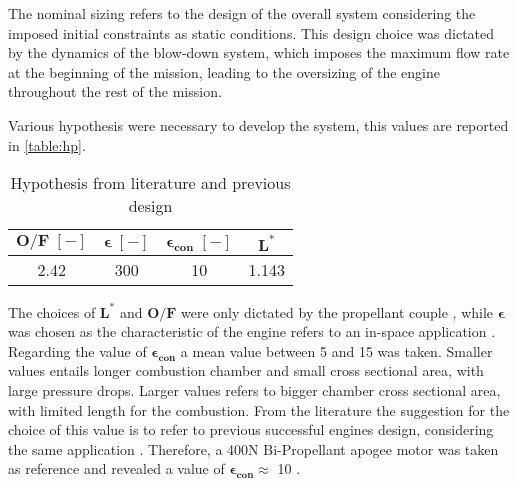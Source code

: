 The nominal sizing refers to the design of the overall system considering the imposed initial constraints as static conditions. This design choice was dictated by the dynamics of the blow-down system, which imposes the maximum flow rate at the beginning of the mission, leading to the oversizing of the engine throughout the rest of the mission. %

Various hypothesis were necessary to develop the system, this values are reported in \autoref{table:hp}.

\begin{table}[H]
    \renewcommand{\arraystretch}{1.2}
    \centering
    \begin{tabular}{|c|c|c|c|}
        \hline
        $\boldsymbol{O/F} \; [-]$ & $\boldsymbol{\epsilon} \; [-]$ & $\boldsymbol{\epsilon_{con}} \; [-]$ & $\boldsymbol{L^*}$ \; [m] \\
        \hline
        2.42 & 300 & 10 & 1.143 \\
        \hline
    \end{tabular}
    \caption{Hypothesis from literature and previous design}
    \label{table:hp}
\end{table}

The choices of $\boldsymbol{L^*}$  and $\boldsymbol{O/F}$ were only dictated by the propellant couple \cite{sutton}, while $\boldsymbol{\epsilon}$ was chosen as the characteristic of the engine refers to an in-space application \cite{ariane_datasheet}. Regarding the value of $\boldsymbol{\epsilon_{con}}$ a mean value between 5 and 15 was taken. Smaller values entails longer combustion chamber and small cross sectional area, with large pressure drops. Larger values refers to bigger chamber cross sectional area, with limited length for the combustion. From the literature the suggestion for the choice of this value is to refer to previous successful engines design, considering the same application \cite{huzel_huang}. Therefore, a 400N Bi-Propellant apogee motor was taken as reference and revealed a value of $\boldsymbol{\epsilon_{con}} \approx$ 10 \cite{ariane_datasheet}.

